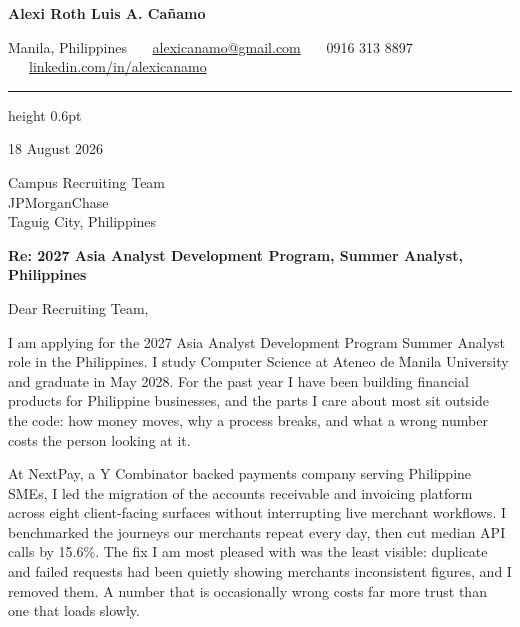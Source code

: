 \documentclass[a4paper, 11pt]{article}
\newcommand{\para}{\vspace{0.6em}}
\begin{document}
\pagestyle{empty}
\raggedright

{\fontsize{17pt}{17pt}\selectfont\textbf{Alexi Roth Luis A. Cañamo}}

\vspace{0.35em}
{\small Manila, Philippines \ \textperiodcentered\ \
\href{mailto:alexicanamo@gmail.com}{\color{black}alexicanamo@gmail.com} \ \textperiodcentered\ \
0916 313 8897 \ \textperiodcentered\ \
\href{https://linkedin.com/in/alexicanamo}{\color{black}linkedin.com/in/alexicanamo}}

\vspace{0.6em}
{\color{rulegrey}\hrule height 0.6pt}
\vspace{1.1em}

18 August 2026
\para

Campus Recruiting Team \\
JPMorganChase \\
Taguig City, Philippines
\para

\textbf{Re: 2027 Asia Analyst Development Program, Summer Analyst, Philippines}
\para\para

Dear Recruiting Team,
\para

I am applying for the 2027 Asia Analyst Development Program Summer Analyst role in the Philippines. I study Computer Science at Ateneo de Manila University and graduate in May 2028. For the past year I have been building financial products for Philippine businesses, and the parts I care about most sit outside the code: how money moves, why a process breaks, and what a wrong number costs the person looking at it.
\para

At NextPay, a Y Combinator backed payments company serving Philippine SMEs, I led the migration of the accounts receivable and invoicing platform across eight client-facing surfaces without interrupting live merchant workflows. I benchmarked the journeys our merchants repeat every day, then cut median API calls by 15.6\%. The fix I am most pleased with was the least visible: duplicate and failed requests had been quietly showing merchants inconsistent figures, and I removed them. A number that is occasionally wrong costs far more trust than one that loads slowly.
\para
\end{document}
